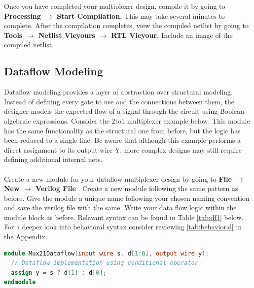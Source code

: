 \documentclass[12pt]{journal}
\begin{document}
\begin{question}
    Once you have completed your multiplexer design, compile it by going to \textbf{Processing $\longrightarrow$ Start Compilation.} This may take several minutes to complete. After the compilation completes, view the compiled netlist by going to \textbf{Tools $\longrightarrow$ Netlist Vieyours $\longrightarrow$ RTL Vieyour.} Include an image of the compiled netlist.
\end{question}

\clearpage
\subsection{Dataflow Modeling}
Dataflow modeling provides a layer of abstraction over structural modeling. Instead of defining every gate to use and the connections between them, the designer models the expected flow of a signal through the circuit using Boolean algebraic expressions. Consider the 2to1 multiplexer example below. This module has the same functionality as the structural one from before, but the logic has been reduced to a single line. Be aware that although this example performs a direct assignment to its output wire Y, more complex designs may still require defining additional internal nets. \\
\\
Create a new module for your dataflow multiplexer design by going to \textbf{File $\longrightarrow$ New $\longrightarrow$ Verilog File }. Create a new module following the same pattern as before. Give the module a unique name following your chosen naming convention and save the verilog file with the same. Write your data flow logic within the module block as before. Relevant syntax can be found in Table \ref{tab:df1} below. For a deeper look into behavioral syntax consider reviewing \vref{tab:behavioral} in the Appendix.
\\
\begin{lstlisting}[language=verilog]
module Mux21Dataflow(input wire s, d[1:0], output wire y);
  // Dataflow implementation using conditional operator
  assign y = s ? d[1] : d[0];
endmodule
\end{lstlisting}
\end{document}
